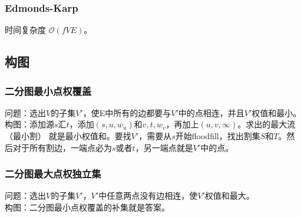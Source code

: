 \subsubsection{Edmonds-Karp}

时间复杂度 $\mathcal{O}(fVE)$。


\subsection{构图}

\subsubsection{二分图最小点权覆盖}

问题：选出$V$的子集$V'$，使E中所有的边都要与$V'$中的点相连，并且$V'$权值和最小。\\
构图：添加源$s$汇$t$，添加$(s,u,w_u)$和$v,t,w_v$，再加上$(u,v,\infty)$。求出的最大流（最小割）
就是最小权值和。要找$V'$，需要从$s$开始floodfill，找出割集$S$和$T$。然后对于所有割边，一端点必为$s$或者$t$，另一端点就是$V'$中的点。

\subsubsection{二分图最大点权独立集}

问题：选出$V$的子集$V'$，$V'$中任意两点没有边相连，使$V'$权值和最大。\\
构图：二分图最小点权覆盖的补集就是答案。
